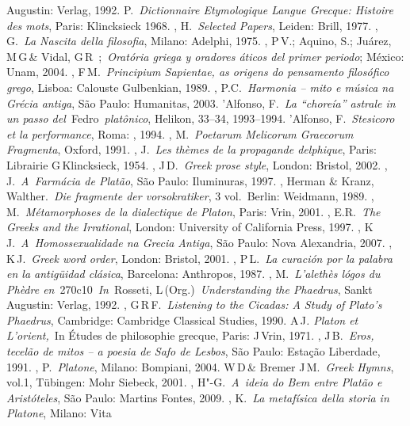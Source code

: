 {\begin{bibliohedra}
  Augustin: Verlag, 1992.
 P.~\emph{Dictionnaire Etymologique Langue Grecque: Histoire
  des mots}, Paris: Klincksieck 1968.
, H.~\emph{Selected Papers}, Leiden: Brill, 1977.
, G.~\emph{La Nascita della filosofia}, Milano: Adelphi, 1975.
, P\,V.; Aquino, S.; Juárez, M\,G\,\& Vidal, G\,R\,  ;~\emph{Oratória griega y oradores áticos del primer periodo}; México:
  Unam, 2004.
, F\,M.~\emph{Principium Sapientae, as origens do pensamento
  filosófico grego}, Lisboa: Calouste Gulbenkian, 1989.
, P.C.~\emph{Harmonia -- mito e música na Grécia antiga}, São
  Paulo: Humanitas, 2003.
'Alfonso, F.~\emph{La ``choreía'' astrale in un passo
  del~}Fedro\emph{~platônico}, Helikon, 33--34, 1993--1994.
'Alfonso, F.~\emph{Stesicoro et la performance}, Roma: , 1994.
, M.~\emph{Poetarum Melicorum Graecorum Fragmenta}, Oxford,
  1991.
, J.~\emph{Les thèmes de la propagande delphique}, Paris:
  Librairie G\,Klincksieck, 1954.
, J\,D.~\emph{Greek prose style}, London: Bristol, 2002.
, J.~\emph{A~Farmácia de Platão}, São Paulo: Iluminuras, 1997.
, Herman \& Kranz, Walther.~\emph{Die fragmente der
  vorsokratiker}, 3 vol.~Berlin: Weidmann, 1989.
, M.~\emph{Métamorphoses de la dialectique de Platon}, Paris:
  Vrin, 2001.
, E.R.~\emph{The Greeks and the Irrational}, London: University
  of California Press, 1997.
, K\,J.~\emph{A~Homossexualidade na Grecia Antiga}, São Paulo:
  Nova Alexandria, 2007.
, K\,J.~\emph{Greek word order}, London: Bristol, 2001.
, P\,L.~\emph{La curación por la palabra en la antigüidad
  clásica}, Barcelona: Anthropos, 1987.
, M.~\emph{L'alethès lógos du Phèdre
  en}~270c10~\emph{In}~Rosseti, L\,(Org.)~\emph{Understanding the
  Phaedrus}, Sankt Augustin: Verlag, 1992.
, G\,R\,F.~\emph{Listening to the Cicadas: A Study of Plato's
  Phaedrus}, Cambridge: Cambridge Classical Studies, 1990.
 A\,J\emph{. Platon et L'orient,~}In Études de philosophie
  grecque, Paris: J\,Vrin, 1971.
, J\,B.~\emph{Eros, tecelão de mitos -- a poesia de Safo de
  Lesbos}, São Paulo: Estação Liberdade, 1991.
, P.~\emph{Platone}, Milano: Bompiani, 2004.
 W\,D\,\& Bremer J\,M.~\emph{Greek Hymns}, vol.1, Tübingen: Mohr
  Siebeck, 2001.
, H"-G.~\emph{A~ideia do Bem entre Platão e Aristóteles}, São
  Paulo: Martins Fontes, 2009.
, K.~\emph{La metafísica della storia in Platone}, Milano: Vita

\end{bibliohedra}}
